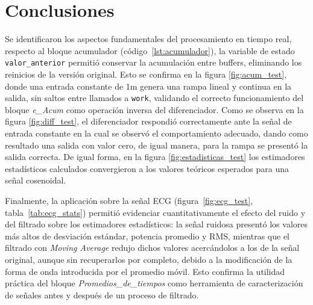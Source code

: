 \documentclass[twocolumn]{IEEEtran}
\begin{document}
\section{Conclusiones}
Se identificaron los aspectos fundamentales del procesamiento en tiempo real, respecto al bloque acumulador (código~\ref{lst:acumulador}), la variable de 
estado \texttt{valor\_anterior} permitió conservar la acumulación entre buffers, 
eliminando los reinicios de la versión original. Esto se confirma en la 
figura \ref{fig:acum_test}, donde una entrada constante de 1m genera una rampa 
lineal y continua en la salida, sin saltos entre llamados a \texttt{work}, 
validando el correcto funcionamiento del bloque \textit{e\_Acum} como operación 
inversa del diferenciador.
Como se observa en la figura \ref{fig:diff_test}, el 
diferenciador respondió correctamente ante la señal de entrada constante en la cual se observó el comportamiento adecuado, dando como resultado una salida con valor cero, de igual manera, para la rampa se presentó la salida correcta. De igual forma, en la figura 
\ref{fig:estadisticas_test} los estimadores estadísticos calculados convergieron 
a los valores teóricos esperados para una señal cosenoidal.


    Finalmente, la aplicación sobre la señal ECG (figura~\ref{fig:ecg_test}, 
tabla~\ref{tab:ecg_stats}) permitió evidenciar cuantitativamente el efecto del 
ruido y del filtrado sobre los estimadores estadísticos: la señal ruidosa 
presentó los valores más altos de desviación estándar, potencia promedio y RMS, 
mientras que el filtrado con \textit{Moving Average} redujo dichos valores 
acercándolos a los de la señal original, aunque sin recuperarlos por completo, 
debido a la modificación de la forma de onda introducida por el promedio móvil. 
Esto confirma la utilidad práctica del bloque \textit{Promedios\_de\_tiempos} 
como herramienta de caracterización de señales antes y después de un proceso de 
filtrado.




\nocite{*}



\end{document}
